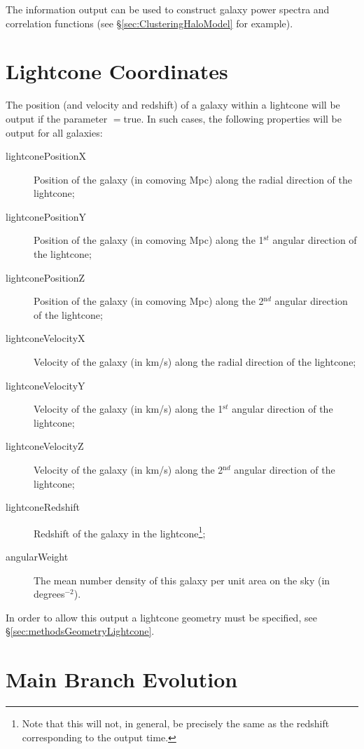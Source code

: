 The information output can be used to construct galaxy power spectra and correlation functions (see \S\ref{sec:ClusteringHaloModel} for example).

\section{Lightcone Coordinates}\label{sec:OutputLightcone}

The position (and velocity and redshift) of a galaxy within a lightcone will be output if the parameter {\normalfont \ttfamily [outputLightconeData]}$=${\normalfont \ttfamily true}. In such cases, the following properties will be output for all galaxies:
\begin{description}
 \item [{\normalfont \ttfamily lightconePositionX}] Position of the galaxy (in comoving Mpc) along the radial direction of the lightcone;
 \item [{\normalfont \ttfamily lightconePositionY}] Position of the galaxy (in comoving Mpc) along the 1$^{\mathrm st}$ angular direction of the lightcone;
 \item [{\normalfont \ttfamily lightconePositionZ}] Position of the galaxy (in comoving Mpc) along the 2$^{\mathrm nd}$ angular direction of the lightcone;
 \item [{\normalfont \ttfamily lightconeVelocityX}] Velocity of the galaxy (in km/s) along the radial direction of the lightcone;
 \item [{\normalfont \ttfamily lightconeVelocityY}] Velocity of the galaxy (in km/s) along the 1$^{\mathrm st}$ angular direction of the lightcone;
 \item [{\normalfont \ttfamily lightconeVelocityZ}] Velocity of the galaxy (in km/s) along the 2$^{\mathrm nd}$ angular direction of the lightcone;
 \item [{\normalfont \ttfamily lightconeRedshift}] Redshift of the galaxy in the lightcone\footnote{Note that this will not, in general, be precisely the same as the redshift corresponding to the output time.};
 \item [{\normalfont \ttfamily angularWeight}] The mean number density of this galaxy per unit area on the sky (in degrees$^{-2}$). 
\end{description}
In order to allow this output a lightcone geometry must be specified, see \S\ref{sec:methodsGeometryLightcone}.

\section{Main Branch Evolution}

